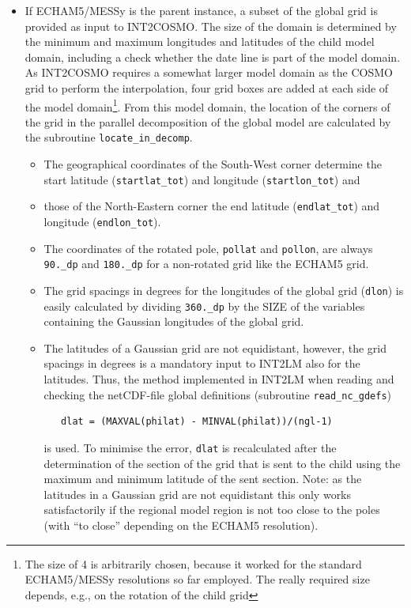 \documentclass[11pt,twoside]{article}
\begin{document}
\begin{itemize}
\begin{itemize}
\begin{itemize}
\item If ECHAM5/MESSy
 is the parent instance, a subset of the global grid is provided as input to 
INT2COSMO. The size of the domain is determined by the minimum and maximum
longitudes and latitudes of the child model domain, including a check whether
the 
date line is part of the model domain. As INT2COSMO requires a somewhat larger 
model domain as the COSMO grid to perform the interpolation, four grid boxes are
added at each side of the model domain\footnote{The size of 4 is arbitrarily
chosen, because it worked for the standard ECHAM5/MESSy
 resolutions so far employed. The really required size depends, e.g., on the
 rotation of the child grid}. 
From this model domain, the location of
the corners of the grid in the parallel decomposition of the global model are 
calculated by the subroutine \verb|locate_in_decomp|.

\begin{itemize} %
 \item The geographical coordinates of the
 South-West corner determine the start latitude (\verb|startlat_tot|) and 
longitude (\verb|startlon_tot|) and
\item those of the North-Eastern corner the end latitude (\verb|endlat_tot|) and 
 longitude (\verb|endlon_tot|).
\item The coordinates of the rotated pole, \verb|pollat| and  \verb|pollon|, are
 always \verb|90._dp| and \verb|180._dp| for a non-rotated grid like the ECHAM5 grid. 
\item The grid spacings in degrees for the
 longitudes of the global grid (\verb|dlon|) is easily 
calculated by dividing \verb|360._dp|  by the {\footnotesize SIZE} of the
variables containing the Gaussian longitudes of the global grid.
\item The latitudes of a Gaussian grid are not equidistant, however, the grid 
spacings in degrees is a mandatory input to INT2LM also for the latitudes. Thus,
the method implemented in INT2LM when reading and checking the netCDF-file 
global definitions (subroutine \verb|read_nc_gdefs|) 
\begin{verbatim}
   dlat = (MAXVAL(philat) - MINVAL(philat))/(ngl-1)
\end{verbatim}
is used.
To minimise the error, \verb|dlat| is recalculated after the determination of the
section of the grid that is sent to the child using the maximum and minimum
latitude of the sent section. Note: as the latitudes in a Gaussian grid are 
not equidistant this only works satisfactorily if the regional model region
is not too close to the poles (with ``to close'' depending on the ECHAM5 
resolution). 


\end{itemize}
\end{itemize}
\end{itemize}
\end{itemize}
\end{document}
